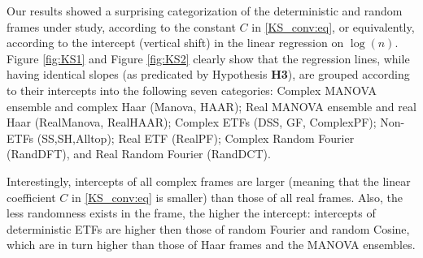 \documentclass[a4paper,12pt]{article}
\newcommand{\TODO}[1]{ {\tt \color{red} [TODO:#1] } }
\newcommand{\E}{\ensuremath{\mathbb{E}}}
\begin{document}
Our results showed a surprising categorization of the deterministic and random
frames under study, according to the constant $C$ in \eqref{KS_conv:eq}, or
equivalently, according to the intercept (vertical shift) in the linear regression 
on $\log(n)$. Figure \ref{fig:KS1} and Figure \ref{fig:KS2} 
clearly show that the regression lines, while having identical slopes (as
predicated by Hypothesis {\bf H3}), are grouped according to their intercepts
into the following 
seven categories:
	Complex MANOVA ensemble and complex Haar (Manova, HAAR);
	Real MANOVA ensemble and real Haar (RealManova, RealHAAR);
	Complex ETFs (DSS, GF, ComplexPF);
	Non-ETFs (SS,SH,Alltop);
	Real ETF (RealPF);
	Complex Random Fourier (RandDFT), and 
	Real Random Fourier (RandDCT).

	Interestingly, intercepts of all complex frames are larger (meaning that the
	linear coefficient $C$ in \eqref{KS_conv:eq} is smaller) than those of all
	real frames. Also, the less randomness exists in the frame, the higher the
	intercept: intercepts of deterministic ETFs are higher then those of random
	Fourier and random Cosine, which are in turn higher than those of Haar
frames and the MANOVA ensembles.


%
%





\end{document}
